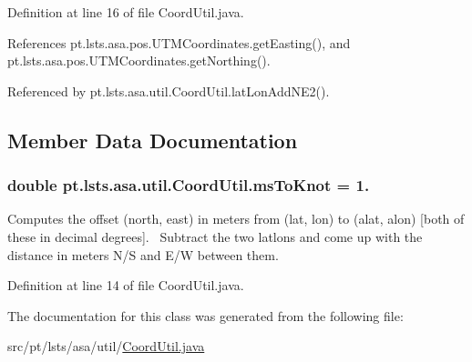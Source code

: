 Definition at line 16 of file Coord\+Util.\+java.



References pt.\+lsts.\+asa.\+pos.\+U\+T\+M\+Coordinates.\+get\+Easting(), and pt.\+lsts.\+asa.\+pos.\+U\+T\+M\+Coordinates.\+get\+Northing().



Referenced by pt.\+lsts.\+asa.\+util.\+Coord\+Util.\+lat\+Lon\+Add\+N\+E2().



\subsection{Member Data Documentation}
\hypertarget{classpt_1_1lsts_1_1asa_1_1util_1_1CoordUtil_abd45c1e9c896dcbf308a73420d2c0d33}{}
\subsubsection[{ms\+To\+Knot}]{\setlength{\rightskip}{0pt plus 5cm}double pt.\+lsts.\+asa.\+util.\+Coord\+Util.\+ms\+To\+Knot = 1.\hspace{0.3cm}{\ttfamily [static]}}\label{classpt_1_1lsts_1_1asa_1_1util_1_1CoordUtil_abd45c1e9c896dcbf308a73420d2c0d33}
Computes the offset (north, east) in meters from (lat, lon) to (alat, alon) \mbox{[}both of these in decimal degrees\mbox{]}.~\newline
 Subtract the two latlons and come up with the distance in meters N/\+S and E/\+W between them. 

Definition at line 14 of file Coord\+Util.\+java.



The documentation for this class was generated from the following file\+:\begin{DoxyCompactItemize}
\item 
src/pt/lsts/asa/util/\hyperlink{CoordUtil_8java}{Coord\+Util.\+java}\end{DoxyCompactItemize}
